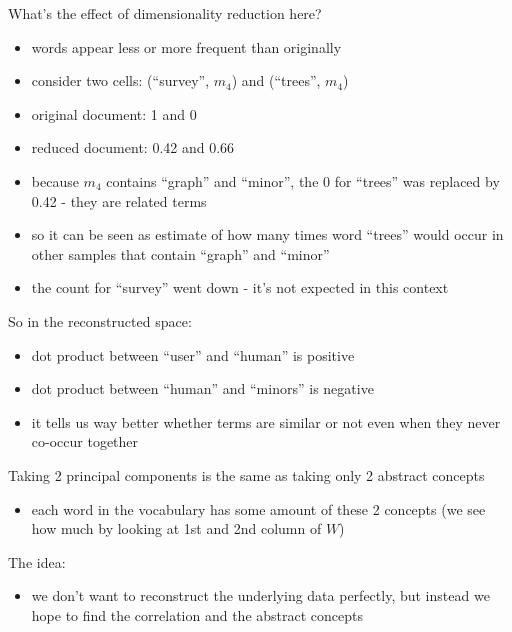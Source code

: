 What's the effect of dimensionality reduction here?

\begin{itemize}
\itemsep1pt\parskip0pt
\item
  words appear less or more frequent than originally
\item
  consider two cells: (``survey'', $m_4$) and (``trees'', $m_4$)
\item
  original document: 1 and 0
\item
  reduced document: 0.42 and 0.66
\item
  because $m_4$ contains ``graph'' and ``minor'', the 0 for ``trees''
  was replaced by 0.42 - they are related terms
\item
  so it can be seen as estimate of how many times word ``trees'' would
  occur in other samples that contain ``graph'' and ``minor''
\item
  the count for ``survey'' went down - it's not expected in this context
\end{itemize}

So in the reconstructed space:

\begin{itemize}
\itemsep1pt\parskip0pt
\item
  dot product between ``user'' and ``human'' is positive
\item
  dot product between ``human'' and ``minors'' is negative
\item
  it tells us way better whether terms are similar or not even when they
  never co-occur together
\end{itemize}

Taking 2 principal components is the same as taking only 2 abstract
concepts

\begin{itemize}
\itemsep1pt\parskip0pt
\item
  each word in the vocabulary has some amount of these 2 concepts (we
  see how much by looking at 1st and 2nd column of $W$)
\end{itemize}

The idea:

\begin{itemize}
\itemsep1pt\parskip0pt
\item
  we don't want to reconstruct the underlying data perfectly, but
  instead we hope to find the correlation and the abstract concepts
\end{itemize}

